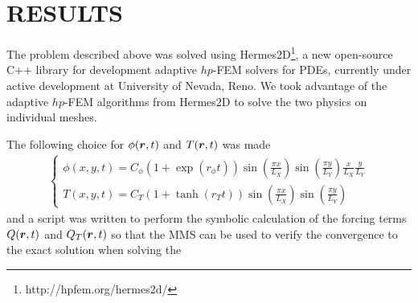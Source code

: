 \section*{RESULTS}
The problem described above was solved using Hermes2D\footnote{http://hpfem.org/hermes2d/}, a new open-source C++ library for development adaptive $hp$-FEM solvers for PDEs, currently under active development at University of Nevada, Reno.  We took advantage of the adaptive $hp$-FEM algorithms \cite{solin2010} from Hermes2D to solve the two physics on individual meshes.


The following choice for $\phi(\boldsymbol{r},t)$ and $T(\boldsymbol{r},t)$ was made
\begin{align}
  \left\{ \begin{array}{l}
      \phi(x,y,t) = C_\phi \left(1+\exp(r_\phi t)\right) \sin\left(\frac{\pi x}{L_X}\right) \sin\left(\frac{\pi y}{L_Y}\right) \frac{x}{L_X} \frac{y}{L_Y} \\
      T(x,y,t) = C_T \left(1+\tanh(r_T t)\right) \sin\left(\frac{\pi x}{L_X}\right) \sin\left(\frac{\pi y}{L_Y}\right)
  \end{array} \right.
\end{align}
and a script was written to perform the symbolic calculation of the forcing terms $Q(\boldsymbol{r},t)$ and $Q_T(\boldsymbol{r},t)$ so that the MMS can be used to verify the convergence to the exact solution when solving the 

